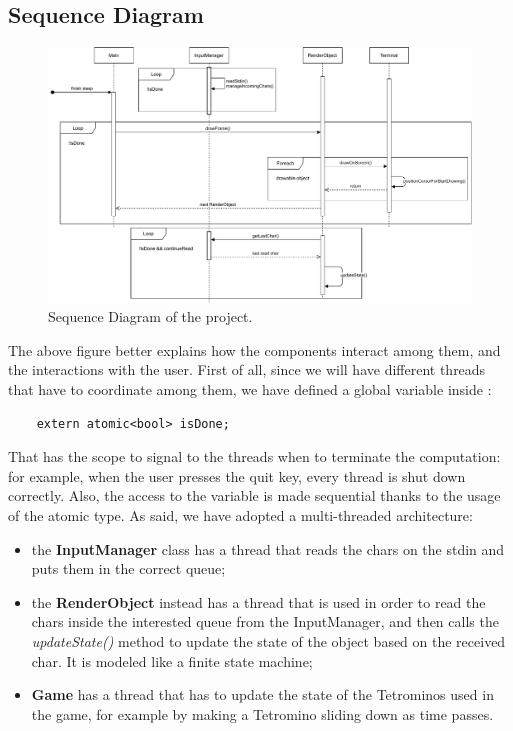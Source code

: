 \documentclass{article}
\begin{document}
\subsection{Sequence Diagram}
\begin{figure}[H]
    \centering
    \includegraphics[width=\linewidth]{img/SequenceDiagram.pdf}
    \caption{Sequence Diagram of the project.}
    \label{fig:sequence}
\end{figure}
The above figure better explains how the components interact among them, and the interactions with the user.
First of all, since we will have different threads that have to coordinate among them, we have defined a global variable inside :
\begin{verbatim}
    extern atomic<bool> isDone;
\end{verbatim}
That has the scope to signal to the threads when to terminate the computation: for example, when the user presses the quit key, every thread is shut down correctly. Also, the access to the variable is made sequential thanks to the usage of the atomic type.
As said, we have adopted a multi-threaded architecture:
\begin{itemize}
    \item the \textbf{InputManager} class has a thread that reads the chars on the stdin and puts them in the correct queue;
    \item the \textbf{RenderObject} instead has a thread that is used in order to read the chars inside the interested queue from the InputManager, and then calls the \textit{updateState()} method to update the state of the object based on the received char. It is modeled like a finite state machine;
    \item \textbf{Game} has a thread that has to update the state of the Tetrominos used in the game, for example by making a Tetromino sliding down as time passes.
\end{itemize}
\end{document}
